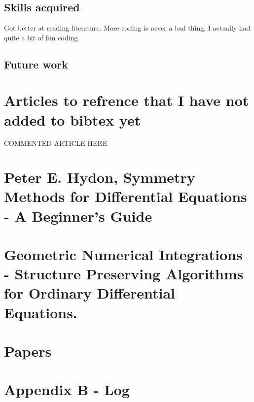 \documentclass[12pt]{article}
\begin{document}
\subsection{Skills acquired}
Got better at reading literature. More coding is never a bad thing, I actually had quite a bit of fun coding.


\subsection{Future work}




\section{Articles to refrence that I have not added to bibtex yet}
COMMENTED ARTICLE HERE





\newpage
\appendix

\section{Peter E. Hydon, Symmetry Methods for Differential Equations - A Beginner's Guide}

\section{Geometric Numerical Integrations - Structure Preserving Algorithms for Ordinary Differential Equations.}

\section{Papers}

\section{Appendix B - Log}
\end{document}
